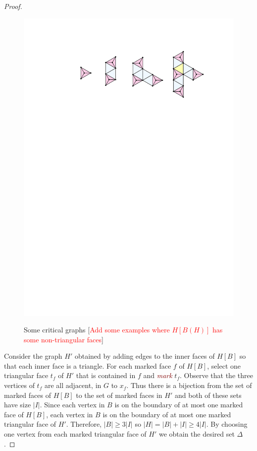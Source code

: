 \documentclass[12pt]{article}
\newcommand{\defin}[1]{\emph{\textcolor{Maroon}{#1}}}
\newcommand{\pat}[1]{[\textcolor{red}{#1}]}
\begin{document}
\begin{proof}
    \begin{figure}
        \begin{center}
            \includegraphics[page=1]{figs/critical} \\
        \end{center}
        \caption{Some critical graphs \pat{Add some examples where $H[B(H)]$ has some non-triangular faces}}
        \label{critical_fig}
    \end{figure}

  Consider the graph $H'$ obtained by adding edges to the inner faces of $H[B]$ so that each inner face is a triangle. For each marked face $f$ of $H[B]$, select one triangular face $t_f$ of $H'$ that is contained in $f$ and \defin{mark} $t_f$.  Observe that the three vertices of $t_f$ are all adjacent, in $G$ to $x_f$.  Thus there is a bijection from the set of marked faces of $H[B]$ to the set of marked faces in $H'$ and both of these sets have size $|I|$.  Since each vertex in $B$ is on the boundary of at most one marked face of $H[B]$, each vertex in $B$ is on the boundary of at most one marked triangular face of $H'$.  Therefore, $|B| \ge 3|I|$ so $|H|=|B|+|I|\ge 4|I|$.  By choosing one vertex from each marked triangular face of $H'$ we obtain the desired set $\Delta$.
\end{proof}
\end{document}

